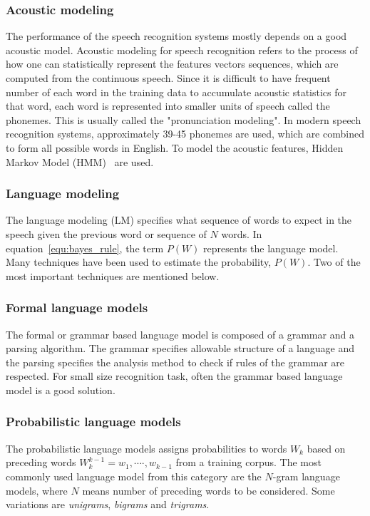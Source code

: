 \documentclass[a4paper, 12pt]{article}
\begin{document}
\subsubsection{Acoustic modeling}
The performance of the speech recognition systems mostly depends on a good acoustic model. Acoustic modeling for speech recognition refers to the process of how one can statistically represent the features vectors sequences, which are computed from the continuous speech. Since it is difficult to have frequent number of each word in the training data to accumulate acoustic statistics for that word, each word is represented into smaller units of speech called the phonemes. This is usually called the  "pronunciation modeling". In modern speech recognition systems, approximately 39-45 phonemes are used, which are combined to form all possible words in English. To model the acoustic features, Hidden Markov Model (HMM)~\cite{hmm_for_SR} are used.

\subsubsection{Language modeling}
The language modeling (LM) specifies what sequence of words to expect in the speech given the previous word or sequence of $N$ words. In equation~\ref{equ:bayes_rule}, the term $P(W)$ represents the language model. Many techniques have been used to estimate the probability, $P(W)$. Two of the most important techniques are mentioned below.
\subsubsection*{Formal language models}
\label{sec:gramar_based_lm}
The formal or grammar based language model is composed of a grammar and a parsing algorithm. The grammar specifies allowable structure of a language and the parsing specifies the analysis method to check if rules of the grammar are respected. For small size recognition task, often the grammar based language model is a good solution.
\subsubsection*{Probabilistic language models}
\label{sec:prob_lang_model}
The probabilistic language models assigns probabilities to words $\textit{W}_k$ based on preceding words $\textit{W}_k^{k-1} = \textit{w}_1 , \cdots \cdot,\textit{w}_{k-1}$  from a training corpus. The most commonly used language model from this category are the $N$-gram language models, where $N$ means number of preceding words to be considered. Some variations are \textit{unigrams}, \textit{bigrams} and \textit{trigrams}.
\end{document}
